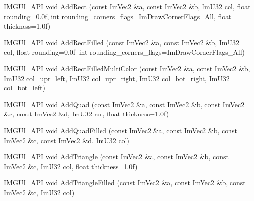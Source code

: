 \begin{DoxyCompactItemize}
\item 
I\+M\+G\+U\+I\+\_\+\+A\+PI void \hyperlink{struct_im_draw_list_ac4a9baaadd92d203f61c395f6158c7e6}{Add\+Rect} (const \hyperlink{struct_im_vec2}{Im\+Vec2} \&a, const \hyperlink{struct_im_vec2}{Im\+Vec2} \&b, Im\+U32 col, float rounding=0.\+0f, int rounding\+\_\+corners\+\_\+flags=\+Im\+Draw\+Corner\+Flags\+\_\+\+All, float thickness=1.\+0f)
\item 
I\+M\+G\+U\+I\+\_\+\+A\+PI void \hyperlink{struct_im_draw_list_a6e8b2ae6cc8c905606e4400e4cfdeeeb}{Add\+Rect\+Filled} (const \hyperlink{struct_im_vec2}{Im\+Vec2} \&a, const \hyperlink{struct_im_vec2}{Im\+Vec2} \&b, Im\+U32 col, float rounding=0.\+0f, int rounding\+\_\+corners\+\_\+flags=\+Im\+Draw\+Corner\+Flags\+\_\+\+All)
\item 
I\+M\+G\+U\+I\+\_\+\+A\+PI void \hyperlink{struct_im_draw_list_ab658e574f3ef67a8d6cc0a86f13f5176}{Add\+Rect\+Filled\+Multi\+Color} (const \hyperlink{struct_im_vec2}{Im\+Vec2} \&a, const \hyperlink{struct_im_vec2}{Im\+Vec2} \&b, Im\+U32 col\+\_\+upr\+\_\+left, Im\+U32 col\+\_\+upr\+\_\+right, Im\+U32 col\+\_\+bot\+\_\+right, Im\+U32 col\+\_\+bot\+\_\+left)
\item 
I\+M\+G\+U\+I\+\_\+\+A\+PI void \hyperlink{struct_im_draw_list_ac3fd62862000b2a7a4e7f61da0a4e3fd}{Add\+Quad} (const \hyperlink{struct_im_vec2}{Im\+Vec2} \&a, const \hyperlink{struct_im_vec2}{Im\+Vec2} \&b, const \hyperlink{struct_im_vec2}{Im\+Vec2} \&c, const \hyperlink{struct_im_vec2}{Im\+Vec2} \&d, Im\+U32 col, float thickness=1.\+0f)
\item 
I\+M\+G\+U\+I\+\_\+\+A\+PI void \hyperlink{struct_im_draw_list_abefdc71c2dc6b6331193aee3ff680ed0}{Add\+Quad\+Filled} (const \hyperlink{struct_im_vec2}{Im\+Vec2} \&a, const \hyperlink{struct_im_vec2}{Im\+Vec2} \&b, const \hyperlink{struct_im_vec2}{Im\+Vec2} \&c, const \hyperlink{struct_im_vec2}{Im\+Vec2} \&d, Im\+U32 col)
\item 
I\+M\+G\+U\+I\+\_\+\+A\+PI void \hyperlink{struct_im_draw_list_ad04c8e04644b1cf54c7c7b8f352d5e41}{Add\+Triangle} (const \hyperlink{struct_im_vec2}{Im\+Vec2} \&a, const \hyperlink{struct_im_vec2}{Im\+Vec2} \&b, const \hyperlink{struct_im_vec2}{Im\+Vec2} \&c, Im\+U32 col, float thickness=1.\+0f)
\item 
I\+M\+G\+U\+I\+\_\+\+A\+PI void \hyperlink{struct_im_draw_list_a2395370cf2dab19fce3c0e2542cd4f25}{Add\+Triangle\+Filled} (const \hyperlink{struct_im_vec2}{Im\+Vec2} \&a, const \hyperlink{struct_im_vec2}{Im\+Vec2} \&b, const \hyperlink{struct_im_vec2}{Im\+Vec2} \&c, Im\+U32 col)
\item 

\end{DoxyCompactItemize}
